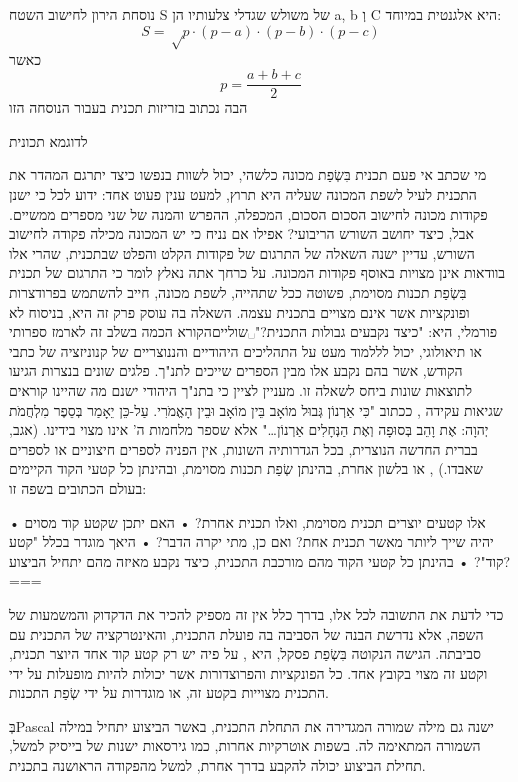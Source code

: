 נוסחת הירון לחישוב השטח S של משולש שגדלי צלעותיו הן a, b וְ C היא אלגנטית במיוחד: \[
S=√{p·(p-a)·(p-b)·(p-c)}
\] כאשר \[
p=\frac{a+b+c}{2}
\] הבה נכתוב בזריזות תכנית  בעבור הנוסחה הזו


{לדוגמא תכונית}

מי שכתב אי פעם תכנית בִּשְׂפַת מכונה כלשהי, יכול לשוות בנפשו כיצד יתרגם המהדר את התכנית לעיל לשפת המכונה שעליה היא תרוץ, למעט ענין פעוט אחד: ידוע לכל כי ישנן פקודות מכונה לחישוב הסכום הסכום, המכפלה, ההפרש והמנה של שני מספרים ממשיים. אבל, כיצד יחושב השורש הריבועי? אפילו אם נניח כי יש המכונה מכילה פקודה לחישוב השורש, עדיין ישנה השאלה של התרגום של פקודות הקלט והפלט שבתכנית, שהרי אלו בוודאות אינן מצויות באוסף פקודות המכונה.
על כרחך אתה נאלץ לומר כי התרגום של תכנית בִּשְׂפַת תכנות מסוימת, פשוטה ככל שתהייה, לשפת מכונה, חייב להשתמש בפרודצרות ופונקציות אשר אינם מצויים בתכנית עצמה. השאלה בה עוסק פרק זה היא, בניסוח לא פורמלי, היא: "כיצד נקבעים גבולות התכנית?"␣שוליים{הקורא הכמה בשלב זה לארמז ספרותי או תיאולוגי, יכול לללמוד מעט על התהליכים היהודיים והננוצריים של קנוניזציה של כתבי הקודש, אשר בהם נקבע אלו מבין הספרים שייכים לתנ"ך. פלגים שונים בנצרות הגיעו לתוצאות שונות ביחס לשאלה זו. מעניין לציין כי בתנ"ך היהודי ישנם מה שהיינו קוראים שגיאות עקידה , ככתוב "כִּי אַרְנוֹן גְּבוּל מוֹאָב בֵּין מוֹאָב וּבֵין הָאֱמֹרִי. עַל-כֵּן יֵאָמַר בְּסֵפֶר מִלְחֲמֹת יְהוָה: אֶת וָהֵב בְּסוּפָה וְאֶת הַנְּחָלִים אַרְנוֹן…" אלא שספר מלחמות ה' אינו מצוי בידינו. (אגב, בברית החדשה הנוצרית, בכל הגדרותיה השונות, אין הפניה לספרים חיצוניים או לספרים שאבדו.)
}, או בלשון אחרת, בהינתן שְׂפַת תכנות מסוימת, ובהינתן כל קטעי הקוד הקיימים בעולם הכתובים בשפה זו:

• אלו קטעים יוצרים תכנית מסוימת, ואלו תכנית אחרת?
• האם יתכן שקטע קוד מסוים יהיה שייך ליותר מאשר תכנית אחת? ואם כן, מתי יקרה הדבר?
• היאך מוגדר בכלל "קטע קוד"?
• בהינתן כל קטעי הקוד מהם מורכבת התכנית, כיצד נקבע מאיזה מהם יתחיל הביצוע?
===

כדי לדעת את התשובה לכל אלו, בדרך כלל אין זה מספיק להכיר את הדקדוק והמשמעות של
השפה, אלא נדרשת הבנה של הסביבה בה פועלת התכנית, והאינטרקציה של התכנית עם
סביבתה.  הגישה הנקוטה בִּשְׂפַת פסקל, היא , על פיה יש רק קטע
קוד אחד היוצר תכנית, וקטע זה מצוי בקובץ אחד. כל הפונקציות והפרוצדורות אשר
יכולות להיות מופעלות על ידי התכנית מצוייות בקטע זה, או מוגדרות על ידי שְׂפַת
התכנות.

בְּPascal ישנה גם מילה שמורה  המגדירה את התחלת התכנית, באשר הביצוע יתחיל במילה השמורה  המתאימה לה. בשפות אוטרקיות אחרות, כמו גירסאות ישנות של בייסיק למשל, תחילת הביצוע יכולה להקבע בדרך אחרת, למשל מהפקודה הראושנה בתכנית.

